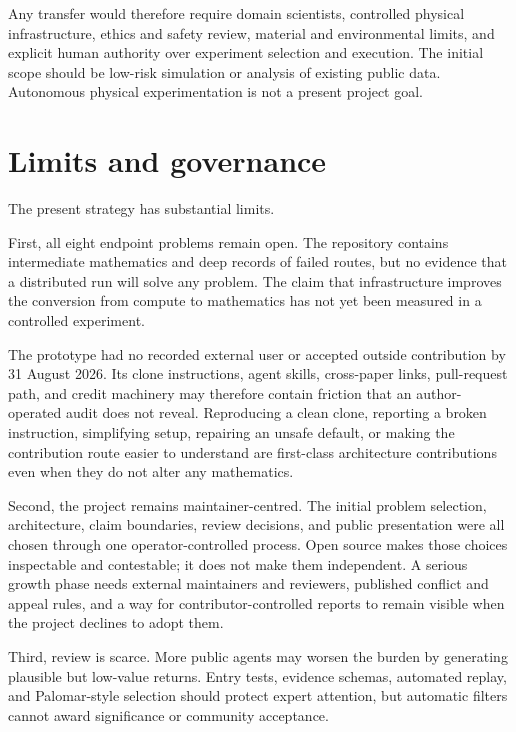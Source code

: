\documentclass[10pt]{article}
\begin{document}
Any transfer would therefore require domain scientists, controlled physical
infrastructure, ethics and safety review, material and environmental limits,
and explicit human authority over experiment selection and execution.  The
initial scope should be low-risk simulation or analysis of existing public
data.  Autonomous physical experimentation is not a present project goal.

\section{Limits and governance}\label{sec:limits}

The present strategy has substantial limits.

First, all eight endpoint problems remain open.  The repository contains
intermediate mathematics and deep records of failed routes, but no evidence
that a distributed run will solve any problem.  The claim that infrastructure
improves the conversion from compute to mathematics has not yet been measured
in a controlled experiment.

The prototype had no recorded external user or accepted outside contribution
by 31 August 2026. Its clone instructions, agent skills, cross-paper links,
pull-request path, and credit machinery may therefore contain friction that an
author-operated audit does not reveal. Reproducing a clean clone, reporting a
broken instruction, simplifying setup, repairing an unsafe default, or making
the contribution route easier to understand are first-class architecture
contributions even when they do not alter any mathematics.

Second, the project remains maintainer-centred.  The initial problem
selection, architecture, claim boundaries, review decisions, and public
presentation were all chosen through one operator-controlled process.  Open
source makes those choices inspectable and contestable; it does not make them
independent.  A serious growth phase needs external maintainers and reviewers,
published conflict and appeal rules, and a way for contributor-controlled
reports to remain visible when the project declines to adopt them.

Third, review is scarce.  More public agents may worsen the burden by
generating plausible but low-value returns.  Entry tests, evidence schemas,
automated replay, and Palomar-style selection should protect expert attention,
but automatic filters cannot award significance or community acceptance.
\end{document}
